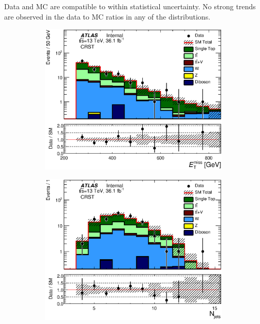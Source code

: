 \indent  Data and MC are compatible to within statistical uncertainty.  No strong trends are observed in the data to MC ratios in any of the distributions. \\

%  

\pagebreak
 
\begin{figure}[h!]
\begin{center}
      \begin{subfigure}[b]{0.40\textwidth}    
\includegraphics[width=\textwidth]{figures/singleTop/postfit/Met_CRST_log.eps}
                 \caption{ }
    \end{subfigure}
     \begin{subfigure}[b]{0.40\textwidth}    
\includegraphics[width=\textwidth]{figures/singleTop/postfit/NJets_CRST_log.eps}

\end{subfigure}
\end{center}
\end{figure}
